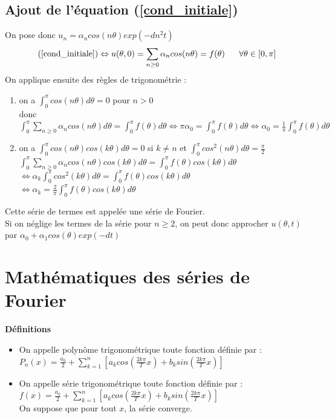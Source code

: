 \documentclass[a4paper,10pt]{report}
\begin{document}
\subsection{Ajout de l'équation (\ref{cond_initiale})}
On pose donc $u_n = \alpha_n cos(n \theta) exp(-dn^2t)$ \\
\abovedisplayskip=0mm
\begin{displaymath}
\text{(\ref{cond_initiale})} \Leftrightarrow u(\theta,0) = \sum \limits_{n\geq 0} \alpha_n cos(n \theta) = f(\theta)  \ \ \ \ \ \forall \theta \in [0,\pi] \\
\end{displaymath}
On applique ensuite des règles de trigonométrie :
\begin{enumerate}
\item on a $\int_0^{\pi}cos(n \theta) d\theta = 0$ pour $n>0$ \\
donc $\int_0^{\pi} \sum \limits_{n\geq 0} \alpha_n cos(n \theta) d\theta = \int_0^{\pi}f(\theta) d\theta \Leftrightarrow \pi \alpha_0 = \int_0^{\pi}f(\theta) d\theta \Leftrightarrow \alpha_0 = \frac{1}{\pi} \int_0^{\pi}f(\theta) d\theta$
\item on a $\int_0^{\pi}cos(n \theta)cos(k \theta) d\theta = 0$ si $k \neq n$ et $\int_0^{\pi}cos^2(n \theta) d\theta = \frac{\pi}{2}$\\
$\int_0^{\pi} \sum \limits_{n\geq 0} \alpha_n cos(n \theta) cos(k \theta) d\theta = \int_0^{\pi} f(\theta) cos(k \theta) d\theta$ \\
$\Leftrightarrow \alpha_k \int_0^{\pi}cos^2(k\theta)d\theta = \int_0^{\pi}f(\theta)cos(k\theta)d\theta$ \\
$\Leftrightarrow \alpha_k = \frac{2}{\pi} \int_0^{\pi}f(\theta)cos(k\theta)d\theta $
\end{enumerate}
Cette série de termes est appelée une série de Fourier. \\
Si on néglige les termes de la série pour $n\geq 2$, on peut donc approcher $u(\theta,t)$ par $\alpha_0 + \alpha_1cos(\theta)exp(-dt)$

\section{Mathématiques des séries de Fourier}
\noindent \textbf{Définitions}
\begin{itemize}
\item On appelle polynôme trigonométrique toute fonction définie par :\\
$P_n(x) = \frac{a_0}{2} + \sum \limits_{k=1}^n \left[ a_k cos\left(\frac{2k\pi}{T}x\right) + b_k sin\left(\frac{2k\pi}{T}x\right) \right]$
\item On appelle série trigonométrique toute fonction définie par :\\
$f(x) = \frac{a_0}{2} + \sum \limits_{k=1}^n \left[ a_k cos\left(\frac{2k\pi}{T}x\right) + b_k sin\left(\frac{2k\pi}{T}x\right) \right]$ \\
On suppose que pour tout $x$, la série converge.
\end{itemize}
\end{document}
